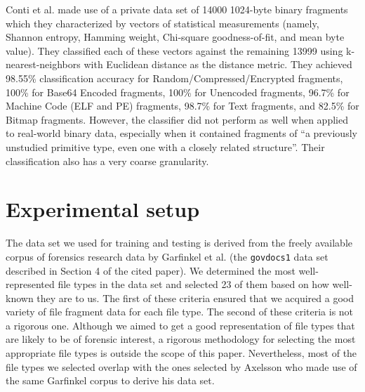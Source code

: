 \documentclass[letter,11pt]{article}
\begin{document}
Conti et al. \cite{Conti10} made use of a private data set of 14000 1024-byte binary fragments which they characterized by vectors of statistical measurements (namely, Shannon entropy, Hamming weight, Chi-square goodness-of-fit, and mean byte value). They classified each of these vectors against the remaining 13999 using k-nearest-neighbors with Euclidean distance as the distance metric. They achieved 98.55\% classification accuracy for Random/Compressed/Encrypted fragments, 100\% for Base64 Encoded fragments, 100\% for Unencoded fragments, 96.7\% for Machine Code (ELF and PE) fragments, 98.7\% for Text fragments, and 82.5\% for Bitmap fragments. However, the classifier did not perform as well when applied to real-world binary data, especially when it contained fragments of ``a previously unstudied primitive type, even one with a closely related structure''. Their classification also has a very coarse granularity.




\section{Experimental setup}
\label{Section:ExperimentalSetup}
The data set we used for training and testing is derived from the freely available corpus of forensics research data by Garfinkel et al. \cite{Garfinkel09} (the \texttt{govdocs1} data set described in Section 4 of the cited paper). We determined the most well-represented file types in the data set and selected 23 of them based on how well-known they are to us. The first of these criteria ensured that we acquired a good variety of file fragment data for each file type. The second of these criteria is not a rigorous one. Although we aimed to get a good representation of file types that are likely to be of forensic interest, a rigorous methodology for selecting the most appropriate file types is outside the scope of this paper. Nevertheless, most of the file types we selected overlap with the ones selected by Axelsson \cite{Axelsson10} who made use of the same Garfinkel corpus to derive his data set.
\end{document}
